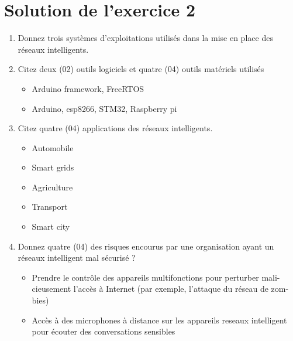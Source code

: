 \section*{Solution de l'exercice 2 \MarksThree}

\begin{enumerate}
    \item Donnez trois systèmes d'exploitations utilisés dans la mise en place des réseaux intelligents.
    \item Citez deux (02) outils logiciels et quatre (04) outils matériels utilisés
          \begin{itemize}
              \item Arduino framework, FreeRTOS
              \item Arduino, esp8266, STM32, Raspberry pi
          \end{itemize}
    \item Citez quatre (04) applications des réseaux intelligents.
          \begin{itemize}
              \item Automobile
              \item Smart grids
              \item Agriculture
              \item Transport
              \item Smart city
          \end{itemize}
    \item Donnez quatre (04) des risques encourus par une organisation ayant un réseaux intelligent mal sécurisé ?
          \begin{itemize}
              \item Prendre le contrôle des appareils multifonctions pour perturber mali-
                    cieusement l’accès à Internet (par exemple, l’attaque du réseau de zom-
                    bies)
              \item Accès à des microphones à distance sur les appareils reseaux intelligent
                    pour écouter des conversations sensibles

\end{itemize}
\end{enumerate}
